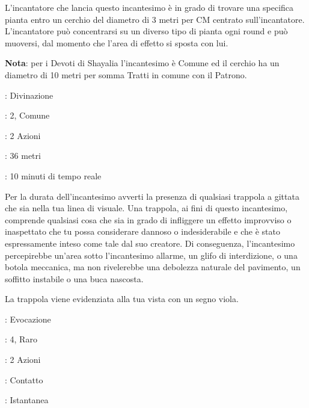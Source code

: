 \begin{multicols}{2}
L'incantatore che lancia questo incantesimo è in grado di trovare una specifica pianta entro un cerchio del diametro di 3 metri per CM centrato sull'incantatore. L'incantatore può concentrarsi su un diverso tipo di pianta ogni round e può muoversi, dal momento che l'area di effetto si sposta con lui.

\textbf{Nota}: per i Devoti di Shayalia l'incantesimo è Comune ed il cerchio ha un diametro di 10 metri per somma Tratti in comune con il Patrono.

\noindent\colorbox{OBSSgold!10}{
\begin{minipage}{0.95\linewidth}
\begin{description}[noitemsep, topsep=0pt, parsep=0pt, partopsep=0pt, leftmargin=0cm, labelwidth=1.3cm]
	\item[\textbf{Lista}]: Divinazione
	\item[\textbf{Livello}]: 2, Comune
	\item[\textbf{Lancio}]: 2 Azioni
	\item[\textbf{Gittata}]: 36 metri
	\item[\textbf{Durata}]: 10 minuti di tempo reale
\end{description}
\end{minipage}}\smallskip

Per la durata dell'incantesimo avverti la presenza di qualsiasi trappola a gittata che sia nella tua linea di visuale. Una trappola, ai fini di questo incantesimo, comprende qualsiasi cosa che sia in grado di infliggere un effetto improvviso o inaspettato che tu possa considerare dannoso o indesiderabile e che è stato espressamente inteso come tale dal suo creatore. Di conseguenza, l'incantesimo percepirebbe un'area sotto l'incantesimo allarme, un glifo di interdizione, o una botola meccanica, ma non rivelerebbe una debolezza naturale del pavimento, un soffitto instabile o una buca nascosta.

La trappola viene evidenziata alla tua vista con un segno viola.

\noindent\colorbox{OBSSgold!10}{
\begin{minipage}{0.95\linewidth}
\begin{description}[noitemsep, topsep=0pt, parsep=0pt, partopsep=0pt, leftmargin=0cm, labelwidth=1.3cm]
	\item[\textbf{Lista}]: Evocazione
	\item[\textbf{Livello}]: 4, Raro
	\item[\textbf{Lancio}]: 2 Azioni
	\item[\textbf{Gittata}]: Contatto
	\item[\textbf{Durata}]: Istantanea
\end{description}
\end{minipage}}\smallskip


\end{multicols}
